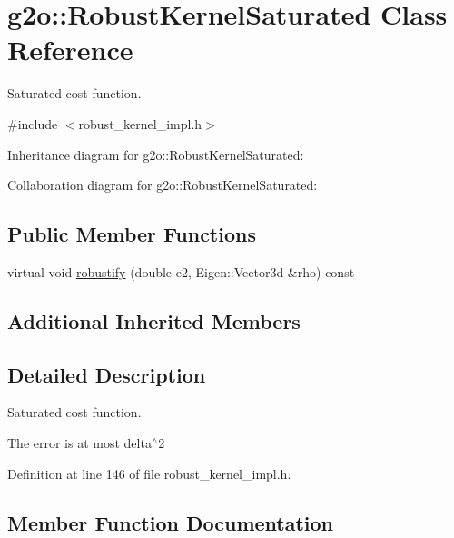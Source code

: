 \hypertarget{classg2o_1_1RobustKernelSaturated}{}\section{g2o\+:\+:Robust\+Kernel\+Saturated Class Reference}
\label{classg2o_1_1RobustKernelSaturated}


Saturated cost function.  




{\ttfamily \#include $<$robust\+\_\+kernel\+\_\+impl.\+h$>$}



Inheritance diagram for g2o\+:\+:Robust\+Kernel\+Saturated\+:


Collaboration diagram for g2o\+:\+:Robust\+Kernel\+Saturated\+:
\subsection*{Public Member Functions}
\begin{DoxyCompactItemize}
\item 
virtual void \hyperlink{classg2o_1_1RobustKernelSaturated_abfae37d6c54155859549ac710a8a8c83}{robustify} (double e2, Eigen\+::\+Vector3d \&rho) const 
\end{DoxyCompactItemize}
\subsection*{Additional Inherited Members}


\subsection{Detailed Description}
Saturated cost function. 

The error is at most delta$^\wedge$2 

Definition at line 146 of file robust\+\_\+kernel\+\_\+impl.\+h.



\subsection{Member Function Documentation}
